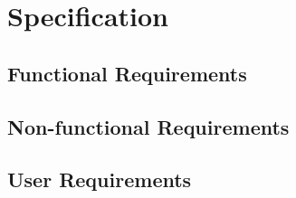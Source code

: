 
\section{Specification}


    \subsection{Functional Requirements}

    \subsection{Non-functional Requirements}

    \subsection{User Requirements}
        
